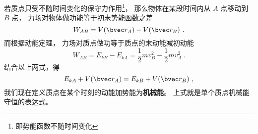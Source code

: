 
若质点只受不随时间变化的保守力作用\footnote{即势能函数不随时间变化}， 那么物体在某段时间内从 $A$ 点移动到 $B$ 点， 力场对物体做功能等于初末势能函数之差
\begin{equation}
W_{AB} = V(\bvec r_A) - V(\bvec r_B)~.
\end{equation}
而根据动能定理， 力场对质点做功等于质点的末动能减初动能
\begin{equation}
W_{AB} = E_{kB} - E_{kA} = \frac12 m v_B^2 - \frac12 m v_A^2~.
\end{equation}
结合以上两式，得
\begin{equation}
E_{kA} + V(\bvec r_A) = E_{kB} + V(\bvec r_B)~,
\end{equation}
我们现在定义质点在某个时刻的动能加势能为\textbf{机械能}。 上式就是单个质点机械能守恒的表达式。
